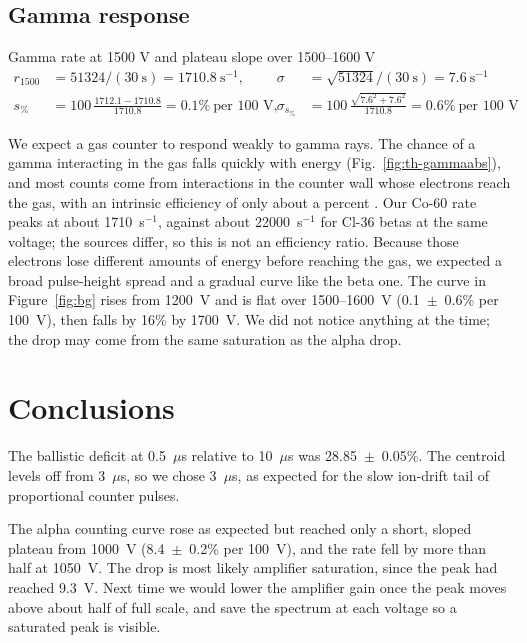 \documentclass[12pt]{article}
\begin{document}
\subsection{Gamma response}

\begin{samplecalc}{Gamma rate at 1500 V and plateau slope over 1500--1600 V}
\begin{align*}
r_{1500} &= 51324/(30\ \text{s}) = 1710.8\ \text{s}^{-1}, & \sigma &= \sqrt{51324}/(30\ \text{s}) = 7.6\ \text{s}^{-1}\\
s_{\%} &= 100\,\frac{1712.1 - 1710.8}{1710.8} = 0.1\%\ \text{per 100 V}, & \sigma_{s_\%} &= 100\,\frac{\sqrt{7.6^2 + 7.6^2}}{1710.8} = 0.6\%\ \text{per 100 V}
\end{align*}
\end{samplecalc}

We expect a gas counter to respond weakly to gamma rays. The chance of a gamma interacting in the gas falls quickly with energy (Fig.~\ref{fig:th-gammaabs}), and most counts come from interactions in the counter wall whose electrons reach the gas, with an intrinsic efficiency of only about a percent \cite{knoll}. Our Co-60 rate peaks at about 1710~s$^{-1}$, against about 22000~s$^{-1}$ for Cl-36 betas at the same voltage; the sources differ, so this is not an efficiency ratio. Because those electrons lose different amounts of energy before reaching the gas, we expected a broad pulse-height spread and a gradual curve like the beta one. The curve in Figure~\ref{fig:bg} rises from 1200~V and is flat over 1500--1600~V (0.1~$\pm$~0.6\% per 100~V), then falls by 16\% by 1700~V. We did not notice anything at the time; the drop may come from the same saturation as the alpha drop.


\section{Conclusions}
\label{sec:conclusions}

The ballistic deficit at 0.5~$\mu$s relative to 10~$\mu$s was 28.85~$\pm$~0.05\%. The centroid levels off from 3~$\mu$s, so we chose 3~$\mu$s, as expected for the slow ion-drift tail of proportional counter pulses.

The alpha counting curve rose as expected but reached only a short, sloped plateau from 1000~V (8.4~$\pm$~0.2\% per 100~V), and the rate fell by more than half at 1050~V. The drop is most likely amplifier saturation, since the peak had reached 9.3~V. Next time we would lower the amplifier gain once the peak moves above about half of full scale, and save the spectrum at each voltage so a saturated peak is visible.
\end{document}
